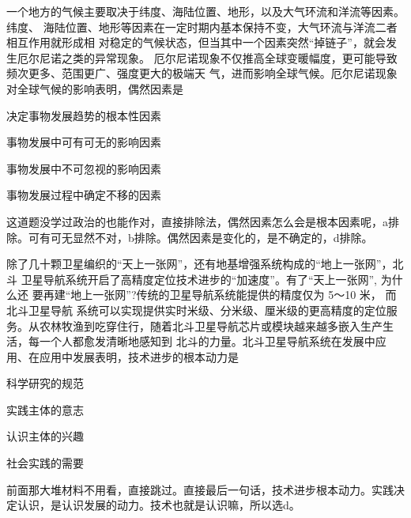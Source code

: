 \documentclass[lang=cn,blue,10pt,scheme=chinese,twocol]{zznote}
\begin{document}
\begin{exercise}一个地方的气候主要取决于纬度、海陆位置、地形，以及大气环流和洋流等因素。纬度、 海陆位置、地形等因素在一定时期内基本保持不变，大气环流与洋流二者相互作用就形成相 对稳定的气候状态，但当其中一个因素突然“掉链子”，就会发生厄尔尼诺之类的异常现象。 厄尔尼诺现象不仅推高全球变暖幅度，更可能导致频次更多、范围更广、强度更大的极端天 气，进而影响全球气候。厄尔尼诺现象对全球气候的影响表明，偶然因素是
	\begin{choice}
		\item 决定事物发展趋势的根本性因素
		\item 事物发展中可有可无的影响因素
		\item 事物发展中不可忽视的影响因素
		\item 事物发展过程中确定不移的因素
	\end{choice}
\end{exercise}
\begin{solution}
	这道题没学过政治的也能作对，直接排除法，偶然因素怎么会是根本因素呢，a排除。可有可无显然不对，b排除。偶然因素是变化的，是不确定的，d排除。
\end{solution}


\begin{exercise}除了几十颗卫星编织的“天上一张网”，还有地基增强系统构成的“地上一张网”，北斗 卫星导航系统开启了高精度定位技术进步的“加速度”。有了“天上一张网”, 为什么还 要再建“地上一张网”?传统的卫星导航系统能提供的精度仅为 5～10 米， 而北斗卫星导航 系统可以实现提供实时米级、分米级、厘米级的更高精度的定位服 务。从农林牧渔到吃穿住行，随着北斗卫星导航芯片或模块越来越多嵌入生产生活，每一个人都愈发清晰地感知到 北斗的力量。北斗卫星导航系统在发展中应用、在应用中发展表明，技术进步的根本动力是
	\begin{choice}
		\item 科学研究的规范
		\item 实践主体的意志
		\item 认识主体的兴趣
		\item 社会实践的需要
	\end{choice}
\end{exercise}
\begin{solution}
	前面那大堆材料不用看，直接跳过。直接最后一句话，技术进步根本动力。实践决定认识，是认识发展的动力。技术也就是认识嘛，所以选d。
\end{solution}
\end{document}
